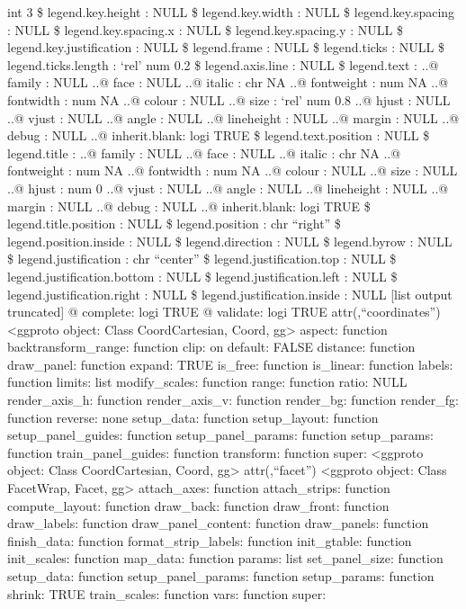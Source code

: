\documentclass[
]{article}
\begin{document}
int 3 \$ legend.key.height : NULL \$ legend.key.width : NULL \$
legend.key.spacing : NULL \$ legend.key.spacing.x : NULL \$
legend.key.spacing.y : NULL \$ legend.key.justification : NULL \$
legend.frame : NULL \$ legend.ticks : NULL \$ legend.ticks.length :
`rel' num 0.2 \$ legend.axis.line : NULL \$ legend.text : ..@ family :
NULL ..@ face : NULL ..@ italic : chr NA ..@ fontweight : num NA ..@
fontwidth : num NA ..@ colour : NULL ..@ size : `rel' num 0.8 ..@ hjust
: NULL ..@ vjust : NULL ..@ angle : NULL ..@ lineheight : NULL ..@
margin : NULL ..@ debug : NULL ..@ inherit.blank: logi TRUE \$
legend.text.position : NULL \$ legend.title : ..@ family : NULL ..@ face
: NULL ..@ italic : chr NA ..@ fontweight : num NA ..@ fontwidth : num
NA ..@ colour : NULL ..@ size : NULL ..@ hjust : num 0 ..@ vjust : NULL
..@ angle : NULL ..@ lineheight : NULL ..@ margin : NULL ..@ debug :
NULL ..@ inherit.blank: logi TRUE \$ legend.title.position : NULL \$
legend.position : chr ``right'' \$ legend.position.inside : NULL \$
legend.direction : NULL \$ legend.byrow : NULL \$ legend.justification :
chr ``center'' \$ legend.justification.top : NULL \$
legend.justification.bottom : NULL \$ legend.justification.left : NULL
\$ legend.justification.right : NULL \$ legend.justification.inside :
NULL {[}list output truncated{]} @ complete: logi TRUE @ validate: logi
TRUE attr(,``coordinates'') \textless ggproto object: Class
CoordCartesian, Coord, gg\textgreater{} aspect: function
backtransform\_range: function clip: on default: FALSE distance:
function draw\_panel: function expand: TRUE is\_free: function
is\_linear: function labels: function limits: list modify\_scales:
function range: function ratio: NULL render\_axis\_h: function
render\_axis\_v: function render\_bg: function render\_fg: function
reverse: none setup\_data: function setup\_layout: function
setup\_panel\_guides: function setup\_panel\_params: function
setup\_params: function train\_panel\_guides: function transform:
function super: \textless ggproto object: Class CoordCartesian, Coord,
gg\textgreater{} attr(,``facet'') \textless ggproto object: Class
FacetWrap, Facet, gg\textgreater{} attach\_axes: function
attach\_strips: function compute\_layout: function draw\_back: function
draw\_front: function draw\_labels: function draw\_panel\_content:
function draw\_panels: function finish\_data: function
format\_strip\_labels: function init\_gtable: function init\_scales:
function map\_data: function params: list set\_panel\_size: function
setup\_data: function setup\_panel\_params: function setup\_params:
function shrink: TRUE train\_scales: function vars: function super:
\end{document}
